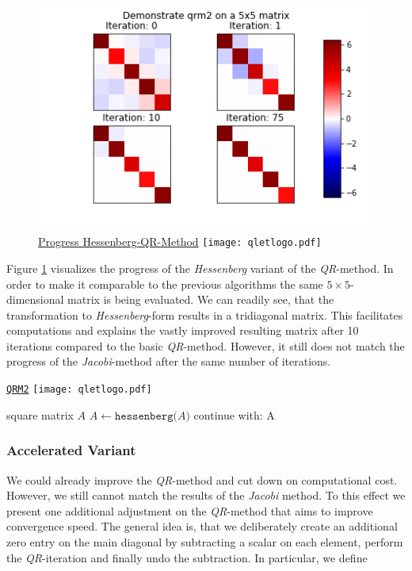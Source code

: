 \documentclass[12pt]{article}
\begin{document}
\begin{figure}
\centering
\caption{\href {https://github.com/thsis/NIS18/tree/master/media/plots}{Progress Hessenberg-QR-Method}  \protect\texttt{[image: qletlogo.pdf]}}
  \label{qr2-plot}
  \includegraphics[scale=0.6]{../media/plots/qrm2.png}
\end{figure}

Figure \ref{qr2-plot} visualizes the progress of the \textit{Hessenberg} variant of the \textit{QR}-method. In order to make it comparable to the previous algorithms the same $5 \times 5$-dimensional matrix is being evaluated. We can readily see, that the transformation to \textit{Hessenberg}-form results in a tridiagonal matrix. This facilitates computations and explains the vastly improved resulting matrix after 10 iterations compared to the basic \textit{QR}-method. However, it still does not match the progress of the \textit{Jacobi}-method after the same number of iterations.


\begin{algorithm}
\caption{\href {https://github.com/thsis/NIS18/blob/master/algorithms/eigen.py}{\texttt{QRM2}}  \protect\texttt{[image: qletlogo.pdf]}}
\label{qr2-meth}
\begin{algorithmic}[1]
  \Require square matrix $A$
  \State $A \gets \texttt{hessenberg(}A\texttt{)}$
  \State continue with:  A
\end{algorithmic}
\end{algorithm}

\subsubsection{Accelerated Variant}

We could already improve the \textit{QR}-method and cut down on computational cost. However, we still cannot match the results of the \textit{Jacobi} method. To this effect we present one additional adjustment on the \textit{QR}-method that aims to improve convergence speed. The general idea is, that we deliberately create an additional zero entry on the main diagonal by subtracting a scalar on each element, perform the \textit{QR}-iteration and finally undo the subtraction. In particular, we define
\end{document}
